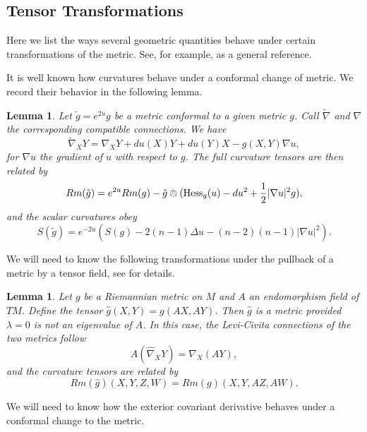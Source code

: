 \documentclass{amsart}
\newtheorem{lem}[thm]{Lemma}
\numberwithin{equation}{section}
\begin{document}
\subsection{Tensor Transformations}

Here we list the ways several geometric quantities behave under certain transformations of the metric.
See, for example, \cite{Lee2018} as a general reference.

It is well known how curvatures behave under a conformal change of metric.
We record their behavior in the following lemma.


\begin{lem}
\label{ConfChange}
Let $\tilde{g} = e^{2u}g$ be a metric conformal to a given metric $g$.
Call $\widetilde{\nabla}$ and $\nabla$ the corresponding compatible connections.
We have 
\[
\widetilde{\nabla}_XY = \nabla_XY + du(X)Y + du(Y)X - g(X,Y)\nabla u,
\]
for $\nabla u$ the gradient of $u$ with respect to $g$.
The full curvature tensors are then related by
\[
Rm(\tilde{g}) = e^{2u}Rm(g) - \tilde{g}\owedge(\mathrm{Hess}_g(u) - du^2 + \frac{1}{2}|\nabla u|^2g),
\]
and the scalar curvatures obey
\[
S(\tilde{g}) = e^{-2u}(S(g) -2(n-1)\Delta u  - (n-2)(n-1)|\nabla u|^2).
\]
\end{lem}

We will need to know the following transformations under the pullback of a metric by a tensor field, see \cite{Bridgeman-Bromberg2022} for details.

\begin{lem}
\label{TensorChange}
Let $g$ be a Riemannian metric on $M$ and $A$ an endomorphism field of $TM$.
Define the tensor $\hat{g}(X,Y) = g(AX,AY)$.
Then $\hat{g}$ is a metric provided $\lambda = 0$ is not an eigenvalue of $A$. 
In this case, the Levi-Civita connections of the two metrics follow
\[
A (\widehat{\nabla}_XY) = \nabla_X(AY),
\]
and the curvature tensors are related by 
\[
Rm(\hat{g})(X,Y,Z,W) = Rm(g)(X,Y,AZ,AW).
\]
\end{lem}

We will need to know how the exterior covariant derivative behaves under a conformal change to the metric.
\end{document}
